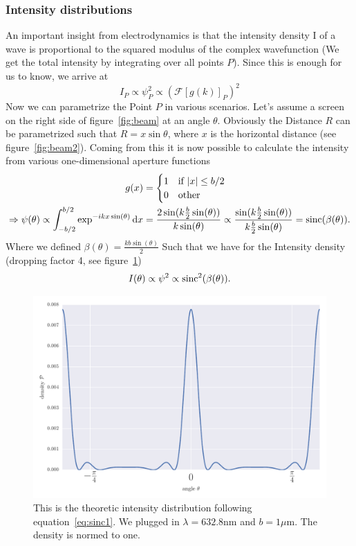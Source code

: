 \subsubsection{Intensity distributions}
An important insight from electrodynamics is that the intensity density I of a
wave is proportional to the squared modulus of the complex wavefunction (We get the total intensity by
integrating over all points $P$).
Since this is enough for us to
know, we arrive at
\begin{equation}
    I_P \propto \psi_P^2 \propto \left ( \mathcal{F} \left[g(k)\right ]_P \right )^2 
\end{equation}
Now we can parametrize the Point $P$ in various scenarios. Let's assume a screen on the right side of
figure~\ref{fig:beam} at an angle $\theta$. Obviously the Distance $R$ can be parametrized such that
$R = x \sin \theta $, where $x$ is the horizontal distance (see figure~\ref{fig:beam2}).
Coming from this it is now possible to calculate the intensity from various one-dimensional aperture
functions
\begin{align}
    \label{eq:g1}
    g(x) &= 
    \begin{cases}
        1 & \text{if } |x| \leq b/2 \\ 
        0 & \text{other }
    \end{cases} \\
    \Rightarrow \psi(\theta) \propto
    \int_{-b/2}^{b/2} \exp ^{-i k x \sin(\theta)} \mathrm{d} x
    &= \frac{2\sin ( k \frac{b}{2} \sin ( \theta ))}{k \sin(\theta)} \propto
    \frac{\sin ( k \frac{b}{2} \sin ( \theta ))}{k \frac{b}{2}  \sin(\theta)} 
    = \mathrm{sinc}(\beta(\theta)).
\end{align}
Where we defined $\beta(\theta) = \frac{kb \sin(\theta)}{2} $
Such that we have for the Intensity density (dropping factor 4, see figure~\ref{fig:sinc1})
\begin{equation}
    \label{eq:sinc1}
    I(\theta) \propto \psi^2 \propto \mathrm{sinc}^2(\beta(\theta)).
\end{equation}
\begin{figure}[htpb]
    \centering
    \includegraphics[width=0.8\linewidth]{figures/sinc1}
    \caption{This is the theoretic intensity distribution following equation~\eqref{eq:sinc1}. 
        We plugged in $\lambda = 632.8$nm and $b = 1 \mu$m. The density is normed to one.}
    \label{fig:sinc1}
\end{figure}

